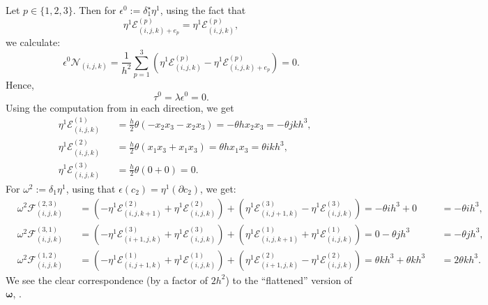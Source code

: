 \begin{example}
  Let $p \in \{1, 2, 3\}$.
  Then for $\epsilon^0 := \delta_1^\star \eta^1$, using the fact that
  \begin{equation}
    \eta^1 \mathcal{E}^{(p)}_{(i, j, k) + e_p} =
    \eta^1 \mathcal{E}^{(p)}_{(i, j, k)},
  \end{equation}
  we calculate:
  \begin{equation}
    \epsilon^0 \mathcal{N}_{(i, j, k)}
    =
      \frac{1}{h^2}
      \sum_{p = 1}^3 (
          \eta^1 \mathcal{E}^{(p)}_{(i, j, k)}
        - \eta^1 \mathcal{E}^{(p)}_{(i, j, k) + e_p}
      )
    = 0.
  \end{equation}
  Hence,
  \begin{equation}
    \tau^0 = \lambda \epsilon^0 = 0.
  \end{equation}
  Using the computation from
  in each direction, we get
  \begin{subequations}
    \begin{alignat}{2}
      & \eta^1 \mathcal{E}^{(1)}_{(i, j, k)} &&
        = \frac{h}{2} \theta (-x_2 x_3 - x_2 x_3)
        = - \theta h x_2 x_3
        = - \theta j k h^3, \\
      & \eta^1 \mathcal{E}^{(2)}_{(i, j, k)} &&
        = \frac{h}{2} \theta (x_1 x_3 + x_1 x_3)
        = \theta h x_1 x_3
        = \theta i k h^3, \\
      & \eta^1 \mathcal{E}^{(3)}_{(i, j, k)} &&
        = \frac{h}{2} \theta (0 + 0)
        = 0.
    \end{alignat}
  \end{subequations}
  For $\omega^2 := \delta_1 \eta^1$, using that
  $\epsilon(c_2) = \eta^1(\partial c_2)$, we get:
  \begin{subequations}
    \begin{alignat}{3}
      & \omega^2 \mathcal{F}^{(2, 3)}_{(i, j, k)}
      && =
        ( - \eta^1 \mathcal{E}^{(2)}_{(i, j, k + 1)}
          + \eta^1 \mathcal{E}^{(2)}_{(i, j, k)}
        )
      + ( \eta^1 \mathcal{E}^{(3)}_{(i, j + 1, k)}
          - \eta^1 \mathcal{E}^{(3)}_{(i, j, k)}
        )
      = - \theta i h^3 + 0
      && = - \theta i h^3, \\
      & \omega^2 \mathcal{F}^{(3, 1)}_{(i, j, k)}
      && =
        ( - \eta^1 \mathcal{E}^{(3)}_{(i + 1, j, k)}
          + \eta^1 \mathcal{E}^{(3)}_{(i, j, k)}
        )
      + ( \eta^1 \mathcal{E}^{(1)}_{(i, j, k + 1)}
          + \eta^1 \mathcal{E}^{(1)}_{(i, j, k)}
        )
      = 0 - \theta j h^3
      && = - \theta j h^3, \\
      & \omega^2 \mathcal{F}^{(1, 2)}_{(i, j, k)}
      && =
        ( - \eta^1 \mathcal{E}^{(1)}_{(i, j + 1, k)}
          + \eta^1 \mathcal{E}^{(1)}_{(i, j, k)}
        )
      + ( \eta^1 \mathcal{E}^{(2)}_{(i + 1, j, k)}
          - \eta^1 \mathcal{E}^{(2)}_{(i, j, k)}
        )
      = \theta k h^3 + \theta k h^3
      && = 2 \theta k h^3.
    \end{alignat}
  \end{subequations}
  We see the clear correspondence (by a factor of $2 h^2$) to the ``flattened''
  version of $\boldsymbol{\omega}$,
  .


\end{example}
